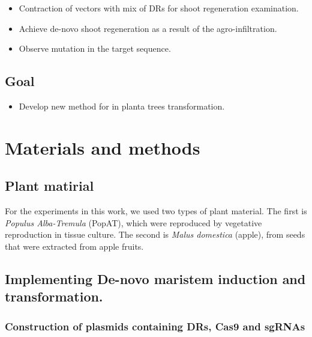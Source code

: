 \documentclass[
]{article}
\providecommand{\tightlist}{%
  \setlength{\itemsep}{0pt}\setlength{\parskip}{0pt}}
\begin{document}
\begin{itemize}
\item
  Contraction of vectors with mix of DRs for shoot regeneration
  examination.
\item
  Achieve de-novo shoot regeneration as a result of the
  agro-infiltration.
\item
  Observe mutation in the target sequence.
\end{itemize}

\hypertarget{goal}{%
\subsection{Goal}\label{goal}}

\begin{itemize}
\tightlist
\item
  Develop new method for in planta trees transformation.
\end{itemize}

\hypertarget{materials-and-methods}{%
\section{Materials and methods}\label{materials-and-methods}}

\hypertarget{plant-matirial}{%
\subsection{Plant matirial}\label{plant-matirial}}

For the experiments in this work, we used two types of plant material.
The first is \emph{Populus Alba-Tremula} (PopAT), which were reproduced
by vegetative reproduction in tissue culture. The second is \emph{Malus
domestica} (apple), from seeds that were extracted from apple fruits.

\hypertarget{implementing-de-novo-maristem-induction-and-transformation.}{%
\subsection{Implementing De-novo maristem induction and
transformation.}\label{implementing-de-novo-maristem-induction-and-transformation.}}

\hypertarget{construction-of-plasmids-containing-drs-cas9-and-sgrnas}{%
\subsubsection{Construction of plasmids containing DRs, Cas9 and
sgRNAs}\label{construction-of-plasmids-containing-drs-cas9-and-sgrnas}}
\end{document}

